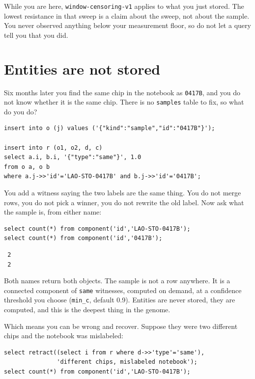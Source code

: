 While you are here, \verb|window-censoring-v1| applies to what you just stored. The lowest resistance in that sweep is a claim about the sweep, not about the sample. You never observed anything below your measurement floor, so do not let a query tell you that you did.

\section{Entities are not stored}

Six months later you find the same chip in the notebook as \verb|0417B|, and you do not know whether it is the same chip. There is no \verb|samples| table to fix, so what do you do?

\begin{verbatim}
insert into o (j) values ('{"kind":"sample","id":"0417B"}');

insert into r (o1, o2, d, c)
select a.i, b.i, '{"type":"same"}', 1.0
from o a, o b
where a.j->>'id'='LAO-STO-0417B' and b.j->>'id'='0417B';
\end{verbatim}

You add a witness saying the two labels are the same thing. You do not merge rows, you do not pick a winner, you do not rewrite the old label. Now ask what the sample is, from either name:

\begin{verbatim}
select count(*) from component('id','LAO-STO-0417B');
select count(*) from component('id','0417B');
\end{verbatim}

\begin{verbatim}
 2
 2
\end{verbatim}

Both names return both objects. The sample is not a row anywhere. It is a connected component of \verb|same| witnesses, computed on demand, at a confidence threshold you choose (\verb|min_c|, default 0.9). Entities are never stored, they are computed, and this is the deepest thing in the genome.

Which means you can be wrong and recover. Suppose they were two different chips and the notebook was mislabeled:

\begin{verbatim}
select retract((select i from r where d->>'type'='same'),
               'different chips, mislabeled notebook');
select count(*) from component('id','LAO-STO-0417B');
\end{verbatim}

